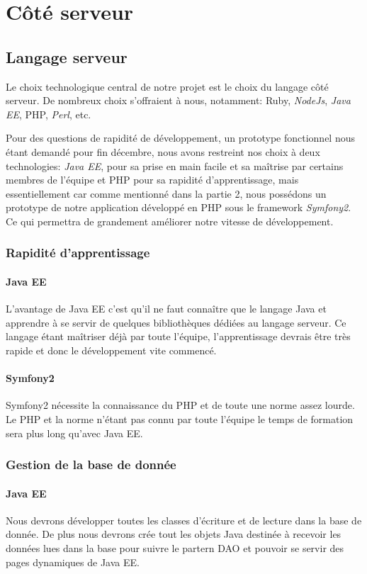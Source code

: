 \section{Côté serveur}

\subsection{Langage serveur}
Le choix technologique central de notre projet est le choix du langage côté serveur. De nombreux choix s'offraient à nous, notamment: Ruby, \textit{NodeJs}, \textit{Java EE}, PHP, \textit{Perl}, etc.

Pour des questions de rapidité de développement, un prototype fonctionnel nous étant demandé pour fin décembre, nous avons restreint nos choix à deux technologies: \textit{Java EE}, pour sa prise en main facile et sa maîtrise par certains membres de l'équipe et PHP pour sa rapidité d'apprentissage, mais essentiellement car comme mentionné dans la partie 2, nous possédons un prototype de notre application développé en PHP sous le framework \textit{Symfony2}. Ce qui permettra de grandement améliorer notre vitesse de développement.\\


\subsubsection{Rapidité d'apprentissage}
\paragraph{Java EE}
L'avantage de Java EE c'est qu'il ne faut connaître que le langage Java et apprendre à se servir de quelques bibliothèques dédiées au langage serveur.
Ce langage étant maîtriser déjà par toute l'équipe, l'apprentissage devrais être très rapide et donc le développement vite commencé.

\paragraph{Symfony2}
Symfony2 nécessite la connaissance du PHP et de toute une norme assez lourde. 
Le PHP et la norme n'étant pas connu par toute l'équipe le temps de formation sera plus long qu'avec Java EE.

\subsubsection{Gestion de la base de donnée}
\paragraph{Java EE}
Nous devrons développer toutes les classes d'écriture et de lecture dans la base de donnée. De plus nous devrons crée tout les objets Java destinée à recevoir les données lues dans la base pour suivre le partern DAO et pouvoir se servir des pages dynamiques de Java EE.

